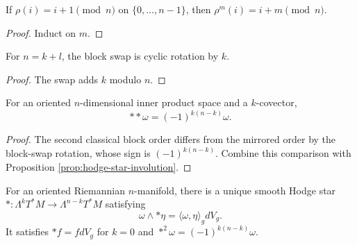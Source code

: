 \begin{lemma}
\label{lem:finrotate-pow-val}
\leanok
If $\rho(i)=i+1\pmod n$ on $\{0,\ldots,n-1\}$, then $\rho^m(i)=i+m\pmod n$.
\end{lemma}
\begin{proof}
\leanok
\sketch Induct on $m$.
\end{proof}

\begin{lemma}
\label{lem:blockswap-eq-rotate}
\leanok
{}
For $n=k+l$, the block swap is cyclic rotation by $k$.
\end{lemma}
\begin{proof}
\leanok
\sketch The swap adds $k$ modulo $n$.
\end{proof}

\begin{proposition}
\label{prop:hodge-star-classical-involution}
\leanok
{}
For an oriented $n$-dimensional inner product space and a $k$-covector,
\[
{*}{*}\omega=(-1)^{k(n-k)}\omega.
\]
\end{proposition}
\begin{proof}
\leanok
\sketch The second classical block order differs from the mirrored order by the block-swap rotation, whose sign is $(-1)^{k(n-k)}$. Combine this comparison with Proposition \ref{prop:hodge-star-involution}.
\end{proof}

\begin{proposition}\label{prop:hodge-star-operator}
\leanok
{}
For an oriented Riemannian $n$-manifold, there is a unique smooth Hodge star
$*:\Lambda^kT^*M\to\Lambda^{n-k}T^*M$ satisfying
\[
\omega\wedge {*}\eta=\langle\omega,\eta\rangle_gdV_g.
\]
It satisfies $*f=fdV_g$ for $k=0$ and
$*^2\omega=(-1)^{k(n-k)}\omega$.
\end{proposition}


